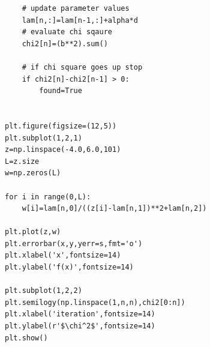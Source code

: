 \begin{verbatim}
    # update parameter values
    lam[n,:]=lam[n-1,:]+alpha*d
    # evaluate chi sqaure
    chi2[n]=(b**2).sum()    

    # if chi square goes up stop
    if chi2[n]-chi2[n-1] > 0:
        found=True

        
plt.figure(figsize=(12,5))
plt.subplot(1,2,1)
z=np.linspace(-4.0,6.0,101)
L=z.size
w=np.zeros(L)

for i in range(0,L):
    w[i]=lam[n,0]/((z[i]-lam[n,1])**2+lam[n,2])

plt.plot(z,w)
plt.errorbar(x,y,yerr=s,fmt='o')
plt.xlabel('x',fontsize=14)
plt.ylabel('f(x)',fontsize=14)

plt.subplot(1,2,2)
plt.semilogy(np.linspace(1,n,n),chi2[0:n])
plt.xlabel('iteration',fontsize=14)
plt.ylabel(r'$\chi^2$',fontsize=14)
plt.show()
\end{verbatim}
\normalsize


\vfill

\newpage


